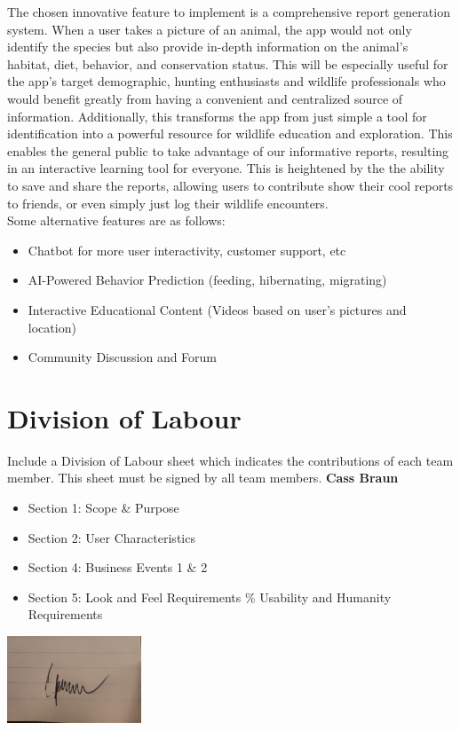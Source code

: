 \documentclass[]{article}
\begin{document}
The chosen innovative feature to implement is a comprehensive report generation system. 
When a user takes a picture of an animal, the app would not only identify the species but also provide in-depth information on the animal’s habitat, diet, behavior, and conservation status. This will be especially useful for the app's target demographic, hunting enthusiasts and wildlife professionals who would benefit greatly from having a convenient and centralized source of information. Additionally, this transforms the app from just simple a tool for identification into a powerful resource for wildlife education and exploration. This enables the general public to take advantage of our informative reports, resulting in an interactive learning tool for everyone. This is heightened by the the ability to save and share the reports, allowing users to contribute show their cool reports to friends, or even simply just log their wildlife encounters. \\

Some alternative features are as follows: 
\begin{itemize}
\item Chatbot for more user interactivity, customer support, etc
\item AI-Powered Behavior Prediction (feeding, hibernating, migrating)
\item Interactive Educational Content (Videos based on user's pictures and location)
\item Community Discussion and Forum

\end{itemize}


\appendix
\newpage
\section{Division of Labour}
\label{sec:division_of_labour}
Include a Division of Labour sheet which indicates the contributions of each team member. This sheet must be signed by all team members.
\newline
\newline
\textbf{Cass Braun}
\begin{itemize}
    \setlength\itemindent{2em}
\item Section 1: Scope \& Purpose
\item Section 2: User Characteristics
\item Section 4: Business Events 1 \& 2
\item Section 5: Look and Feel Requirements \% Usability and Humanity Requirements
\end{itemize}
\includegraphics[width=0.3\textwidth]{Cass.jpg}
\end{document}
